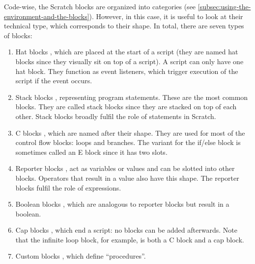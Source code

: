\documentclass[../main]{subfiles}
\begin{document}
Code-wise, the Scratch blocks are organized into categories (see \cref{subsec:using-the-environment-and-the-blocks}).
However, in this case, it is useful to look at their technical type, which corresponds to their shape.
In total, there are seven types of blocks:

\begin{enumerate}[noitemsep]
    \item Hat blocks \scratchinline{\blockinit{\hspace{1em}\dots\hspace*{1em}}}, which are placed at the start of a script (they are named hat blocks since they visually sit on top of a script).
        A script can only have one hat block.
        They function as event listeners, which trigger execution of the script if the event occurs.
    \item Stack blocks \scratchinline{\blockmove{\hspace{1em}\dots\hspace*{0.5cm}}}, representing program statements.
        These are the most common blocks.
        They are called stack blocks since they are stacked on top of each other.
        Stack blocks broadly fulfil the role of statements in Scratch.
    \item C blocks \scratchinline{\blockif{\hspace{1em}\dots\hspace*{1em}}{\blockspace[0.2]}}, which are named after their shape.
        They are used for most of the control flow blocks: loops and branches.
        The variant for the if/else block is sometimes called an E block since it has two slots.
    \item Reporter blocks \ovalmove{\hspace{1em}\dots\hspace*{1em}}, act as variables or values and can be slotted into other blocks.
        Operators that result in a value also have this shape.
        The reporter blocks fulfil the role of expressions.
    \item Boolean blocks \boolsensing{\hspace{1em}\dots\hspace*{1em}}, which are analogous to reporter blocks but result in a boolean.
    \item Cap blocks \scratchinline{\blockstop{\hspace{1em}\dots\hspace*{1em}}}, which end a script: no blocks can be added afterwards.
        Note that the infinite loop block, for example, is both a C block and a cap block.
    \item Custom blocks , which define ``procedures''.
\end{enumerate}
\end{document}
